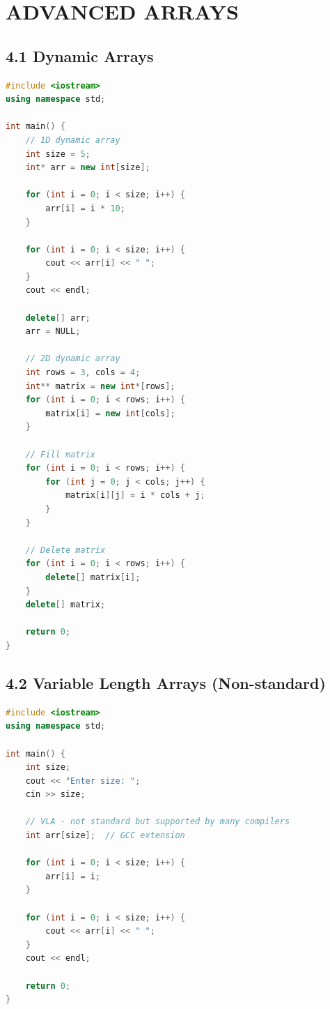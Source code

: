 \hypertarget{advanced-arrays}{%
\chapter{ADVANCED ARRAYS}\label{advanced-arrays}}

\hypertarget{dynamic-arrays}{%
\section{4.1 Dynamic Arrays}\label{dynamic-arrays}}

\begin{lstlisting}[language={C++}]
#include <iostream>
using namespace std;

int main() {
    // 1D dynamic array
    int size = 5;
    int* arr = new int[size];
    
    for (int i = 0; i < size; i++) {
        arr[i] = i * 10;
    }
    
    for (int i = 0; i < size; i++) {
        cout << arr[i] << " ";
    }
    cout << endl;
    
    delete[] arr;
    arr = NULL;
    
    // 2D dynamic array
    int rows = 3, cols = 4;
    int** matrix = new int*[rows];
    for (int i = 0; i < rows; i++) {
        matrix[i] = new int[cols];
    }
    
    // Fill matrix
    for (int i = 0; i < rows; i++) {
        for (int j = 0; j < cols; j++) {
            matrix[i][j] = i * cols + j;
        }
    }
    
    // Delete matrix
    for (int i = 0; i < rows; i++) {
        delete[] matrix[i];
    }
    delete[] matrix;
    
    return 0;
}
\end{lstlisting}

\hypertarget{variable-length-arrays-non-standard}{%
\section{4.2 Variable Length Arrays
(Non-standard)}\label{variable-length-arrays-non-standard}}

\begin{lstlisting}[language={C++}]
#include <iostream>
using namespace std;

int main() {
    int size;
    cout << "Enter size: ";
    cin >> size;
    
    // VLA - not standard but supported by many compilers
    int arr[size];  // GCC extension
    
    for (int i = 0; i < size; i++) {
        arr[i] = i;
    }
    
    for (int i = 0; i < size; i++) {
        cout << arr[i] << " ";
    }
    cout << endl;
    
    return 0;
}
\end{lstlisting}

